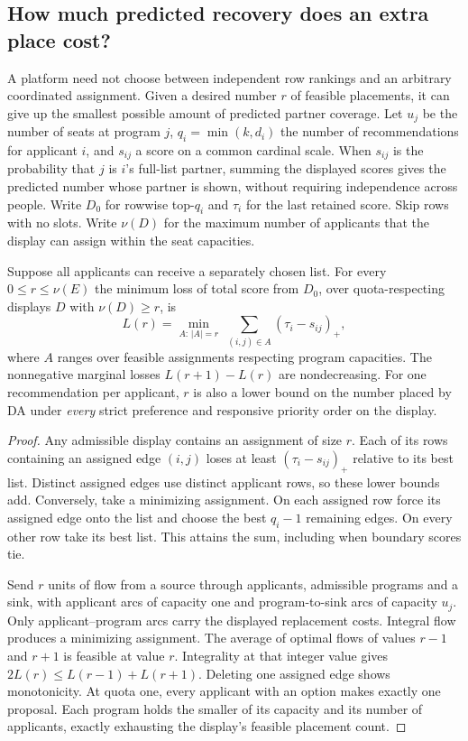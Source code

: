 \subsection{How much predicted recovery does an extra place cost?}\label{sec:shortlist-frontier}
A platform need not choose between independent row rankings and an arbitrary coordinated assignment. Given a desired number $r$ of feasible placements, it can give up the smallest possible amount of predicted partner coverage. Let $u_j$ be the number of seats at program $j$, $q_i=\min(k,d_i)$ the number of recommendations for applicant $i$, and $s_{ij}$ a score on a common cardinal scale. When $s_{ij}$ is the probability that $j$ is $i$'s full-list partner, summing the displayed scores gives the predicted number whose partner is shown, without requiring independence across people. Write $D_0$ for rowwise top-$q_i$ and $\tau_i$ for the last retained score. Skip rows with no slots. Write $\nu(D)$ for the maximum number of applicants that the display can assign within the seat capacities.

\begin{theorem}\label{thm:capacity-frontier}
Suppose all applicants can receive a separately chosen list. For every $0\le r\le\nu(E)$ the minimum loss of total score from $D_0$, over quota-respecting displays $D$ with $\nu(D)\ge r$, is
\[
L(r)=\min_{A:\,|A|=r}\;\sum_{(i,j)\in A}(\tau_i-s_{ij})_+ ,
\]
where $A$ ranges over feasible assignments respecting program capacities. The nonnegative marginal losses $L(r+1)-L(r)$ are nondecreasing. For one recommendation per applicant, $r$ is also a lower bound on the number placed by DA under \emph{every} strict preference and responsive priority order on the display.
\end{theorem}
\begin{proof}
Any admissible display contains an assignment of size $r$. Each of its rows containing an assigned edge $(i,j)$ loses at least $(\tau_i-s_{ij})_+$ relative to its best list. Distinct assigned edges use distinct applicant rows, so these lower bounds add. Conversely, take a minimizing assignment. On each assigned row force its assigned edge onto the list and choose the best $q_i-1$ remaining edges. On every other row take its best list. This attains the sum, including when boundary scores tie.

Send $r$ units of flow from a source through applicants, admissible programs and a sink, with applicant arcs of capacity one and program-to-sink arcs of capacity $u_j$. Only applicant--program arcs carry the displayed replacement costs. Integral flow produces a minimizing assignment. The average of optimal flows of values $r-1$ and $r+1$ is feasible at value $r$. Integrality at that integer value gives $2L(r)\le L(r-1)+L(r+1)$. Deleting one assigned edge shows monotonicity. At quota one, every applicant with an option makes exactly one proposal. Each program holds the smaller of its capacity and its number of applicants, exactly exhausting the display's feasible placement count.
\end{proof}

